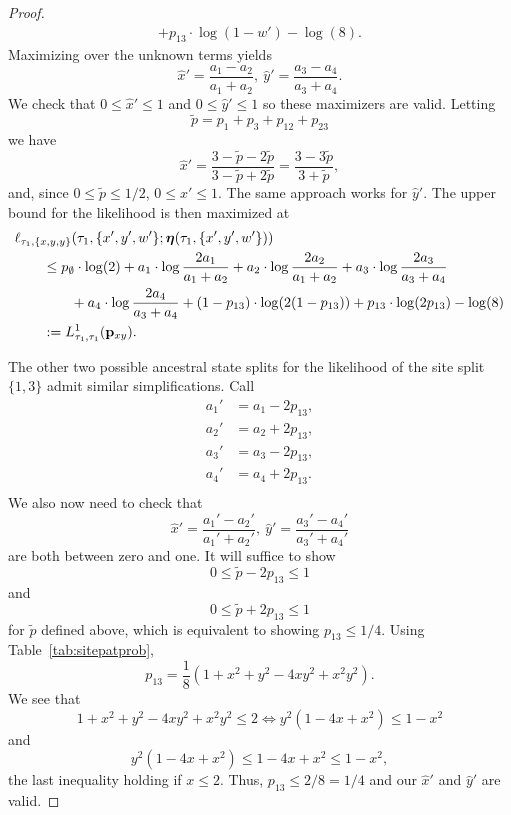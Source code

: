 \begin{proof}
\begin{equation*}
\begin{split}
+ p_{13}\cdot\log(1-w')
- \log(8).
\end{split}
\end{equation*}
Maximizing over the unknown terms yields
$$
\hat{x}' = \frac{a_{1}-a_{2}}{a_{1}+a_{2}}, \ \hat{y}' = \frac{a_{3}-a_{4}}{a_{3}+a_{4}}.
$$
We check that $0 \le \hat{x}' \le 1$ and $0 \le \hat{y}' \le 1$ so these maximizers are valid.
Letting
$$
\tilde{p} = p_{1}+p_{3}+p_{12}+p_{23}
$$
we have
$$
\hat{x}' = \frac{3-\tilde{p} - 2\tilde{p}}{3-\tilde{p}+2\tilde{p}} = \frac{3-3\tilde{p}}{3+\tilde{p}},
$$
and, since $0 \le \tilde{p} \le 1/2$, $0 \le \hat{x}' \le 1$.
The same approach works for $\hat{y}'$.
The upper bound for the likelihood is then maximized at
\begin{align*}
&    \ell_{\tau_1,\{x,y,y\}}(\tau_1, \{x',y',w'\}; \boldsymbol\eta(\tau_1,\{x',y',w'\})) \\
&\qquad\le      p_{\emptyset}  \cdot\log(2)
+ a_{1}\cdot\log\frac{2a_{1}}{a_{1}+a_{2}}
+ a_{2}\cdot\log\frac{2a_{2}}{a_{1}+a_{2}}
+ a_{3}\cdot\log\frac{2a_{3}}{a_{3}+a_{4}} \\
&\qquad\qquad + a_{4}\cdot\log\frac{2a_{4}}{a_{3}+a_{4}}
+ (1-p_{13})\cdot\log(2(1-p_{13}))
+ p_{13}\cdot\log(2p_{13})
- \log(8) \\
&\qquad := L^{1}_{\tau_1,\tau_1}(\mathbf{p}_{xy}).
\end{align*}

The other two possible ancestral state splits for the likelihood of the site split $\{1,3\}$ admit similar simplifications.
Call
\begin{equation}
    \begin{aligned}
        a_{1}' &= a_{1}-2p_{13}, \\
        a_{2}' &= a_{2}+2p_{13}, \\
        a_{3}' &= a_{3}-2p_{13}, \\
        a_{4}' &= a_{4}+2p_{13}. \\
    \end{aligned}
    \label{eq:a_const_prime}
\end{equation}
We also now need to check that
$$
\hat{x}' = \frac{a_{1}'-a_{2}'}{a_{1}'+a_{2}'}, \ \hat{y}' = \frac{a_{3}'-a_{4}'}{a_{3}'+a_{4}'}
$$
are both between zero and one.
It will suffice to show
$$
0 \le \tilde{p} - 2p_{13} \le 1
$$
and
$$
0 \le \tilde{p} + 2p_{13} \le 1
$$
for $\tilde{p}$ defined above, which is equivalent to showing $p_{13} \le 1/4$.
Using Table~\ref{tab:sitepatprob},
$$
p_{13} = \frac{1}{8}\left(1 + x^2 + y^2 - 4xy^2 + x^2y^2\right).
$$
We see that
$$
1 + x^2 + y^2 - 4xy^2 + x^2y^2 \le 2 \iff y^2\left(1 - 4x + x^2\right) \le 1 - x^2
$$
and
$$
y^2\left(1 - 4x + x^2\right) \le 1 - 4x + x^2 \le 1 - x^2,
$$
the last inequality holding if $x \le 2$.
Thus, $p_{13} \le 2/8 = 1/4$ and our $\hat{x}'$ and $\hat{y}'$ are valid.


\end{proof}
